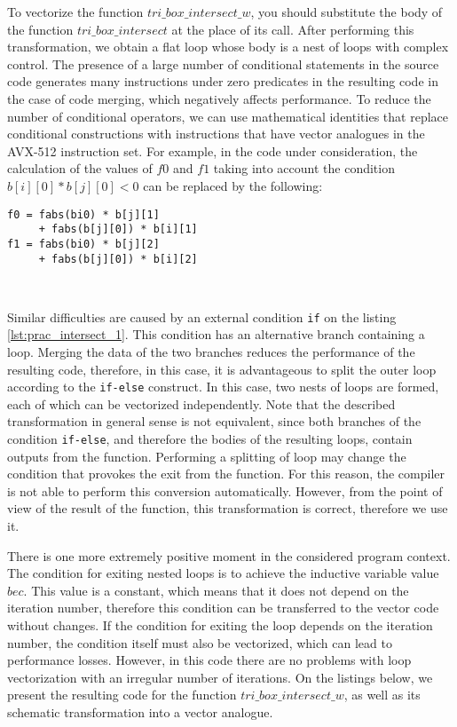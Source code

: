 \documentclass[
11pt,%
tightenlines,%
twoside,%
onecolumn,%
nofloats,%
nobibnotes,%
nofootinbib,%
superscriptaddress,%
noshowpacs,%
centertags]%
{revtex4}
\begin{document}
To vectorize the function $tri\_box\_intersect\_w$, you should substitute the body of the function $tri\_box\_intersect$ at the place of its call.
After performing this transformation, we obtain a flat loop whose body is a nest of loops with complex control.
The presence of a large number of conditional statements in the source code generates many instructions under zero predicates in the resulting code in the case of code merging, which negatively affects performance.
To reduce the number of conditional operators, we can use mathematical identities that replace conditional constructions with instructions that have vector analogues in the AVX-512 instruction set.
For example, in the code under consideration, the calculation of the values of $f0$ and $f1$ taking into account the condition $b[i][0] * b[j][0] < 0$ can be replaced by the following:
\begin{lstlisting}[caption={Using identities to implement vector instructions.},label={lst:prac_intersect_16_2}]
f0 = fabs(bi0) * b[j][1]
     + fabs(b[j][0]) * b[i][1]
f1 = fabs(bi0) * b[j][2]
     + fabs(b[j][0]) * b[i][2]
\end{lstlisting}

\

Similar difficulties are caused by an external condition \texttt{if} on the listing \ref{lst:prac_intersect_1}.
This condition has an alternative branch containing a loop.
Merging the data of the two branches reduces the performance of the resulting code, therefore, in this case, it is advantageous to split the outer loop according to the \texttt{if-else} construct.
In this case, two nests of loops are formed, each of which can be vectorized independently.
Note that the described transformation in general sense is not equivalent, since both branches of the condition \texttt{if-else}, and therefore the bodies of the resulting loops, contain outputs from the function.
Performing a splitting of loop may change the condition that provokes the exit from the function.
For this reason, the compiler is not able to perform this conversion automatically.
However, from the point of view of the result of the function, this transformation is correct, therefore we use it.

There is one more extremely positive moment in the considered program context.
The condition for exiting nested loops is to achieve the inductive variable value $bec$.
This value is a constant, which means that it does not depend on the iteration number, therefore this condition can be transferred to the vector code without changes.
If the condition for exiting the loop depends on the iteration number, the condition itself must also be vectorized, which can lead to performance losses.
However, in this code there are no problems with loop vectorization with an irregular number of iterations.
On the listings below, we present the resulting code for the function $tri\_box\_intersect\_w$, as well as its schematic transformation into a vector analogue.
\end{document}
